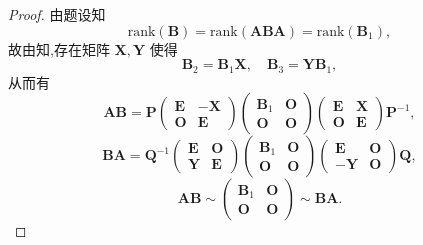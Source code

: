\documentclass[../../main.tex]{subfiles}
\begin{document}
\begin{proof}
由题设知
\[
\mathrm{rank}(\boldsymbol{B}) = \mathrm{rank}(\boldsymbol{ABA}) = \mathrm{rank}(\boldsymbol{B}_1),
\]
故由知,存在矩阵 \( \boldsymbol{X}, \boldsymbol{Y} \) 使得
\[
\boldsymbol{B}_2 = \boldsymbol{B}_1\boldsymbol{X}, \quad \boldsymbol{B}_3 = \boldsymbol{Y}\boldsymbol{B}_1,
\]
从而有
\[
\boldsymbol{AB} = \boldsymbol{P} \begin{pmatrix} \boldsymbol{E} & -\boldsymbol{X} \\ \boldsymbol{O} & \boldsymbol{E} \end{pmatrix} \begin{pmatrix} \boldsymbol{B}_1 & \boldsymbol{O} \\ \boldsymbol{O} & \boldsymbol{O} \end{pmatrix} \begin{pmatrix} \boldsymbol{E} & \boldsymbol{X} \\ \boldsymbol{O} & \boldsymbol{E} \end{pmatrix} \boldsymbol{P}^{-1},
\]
\[
\boldsymbol{BA} = \boldsymbol{Q}^{-1} \begin{pmatrix} \boldsymbol{E} & \boldsymbol{O} \\ \boldsymbol{Y} & \boldsymbol{E} \end{pmatrix} \begin{pmatrix} \boldsymbol{B}_1 & \boldsymbol{O} \\ \boldsymbol{O} & \boldsymbol{O} \end{pmatrix} \begin{pmatrix} \boldsymbol{E} & \boldsymbol{O} \\ -\boldsymbol{Y} & \boldsymbol{O} \end{pmatrix} \boldsymbol{Q},
\]
\[
\boldsymbol{AB} \sim \begin{pmatrix} \boldsymbol{B}_1 & \boldsymbol{O} \\ \boldsymbol{O} & \boldsymbol{O} \end{pmatrix} \sim \boldsymbol{BA}.
\]

\end{proof}
\end{document}
